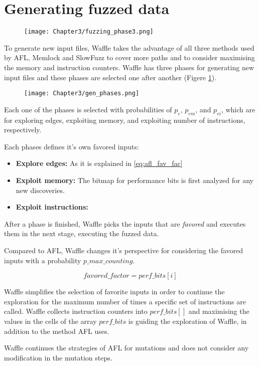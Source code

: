 \section{Generating fuzzed data}

\begin{figure}[H]
    \centering
    \texttt{[image: Chapter3/fuzzing\_phase3.png]}
\end{figure}

To generate new input files, Waffle takes the advantage of all three methods used by AFL, Memlock and SlowFuzz to cover more paths and to consider maximising the memory and instruction counters. Waffle has three phases for generating new input files and these phases are selected one after another (Figere \ref{fig:gen_phases}).

\begin{figure}[H]
    \centering
    \texttt{[image: Chapter3/gen\_phases.png]}
    \label{fig:gen_phases}
\end{figure}

Each one of the phases is selected with probabilities of $p_{e}$, $p_{em}$, and $p_{ei}$, which are for exploring edges, exploiting memory, and exploiting number of instructions, respectively.

Each phases defines it's own favored inputs:
\begin{itemize}
    \item \textbf{Explore edges:} As it is explained in \ref{eq:afl_fav_fac}
    \item \textbf{Exploit memory:} The bitmap for performance bits is first analyzed for any new discoveries. 
    \item \textbf{Exploit instructions:}
\end{itemize}

After a phase is finished, Waffle picks the inputs that are \textit{favored} and executes them in the next stage, executing the fuzzed data.

Compared to AFL, Waffle changes it's perspective for considering the favored inputs with a probability $p\_max\_counting$. 

\begin{equation}
    favored\_factor = perf\_bits[i]
\end{equation}

Waffle simplifies the selection of favorite inputs in order to continue the exploration for the maximum number of times a specific set of instructions are called. Waffle collects instruction counters into $perf\_bits[]$ and maximising the values in the cells of the array $perf\_bits$ is guiding the exploration of Waffle, in addition to the method AFL uses. 

Waffle continues the strategies of AFL for mutations and does not consider any modification in the mutation steps.

